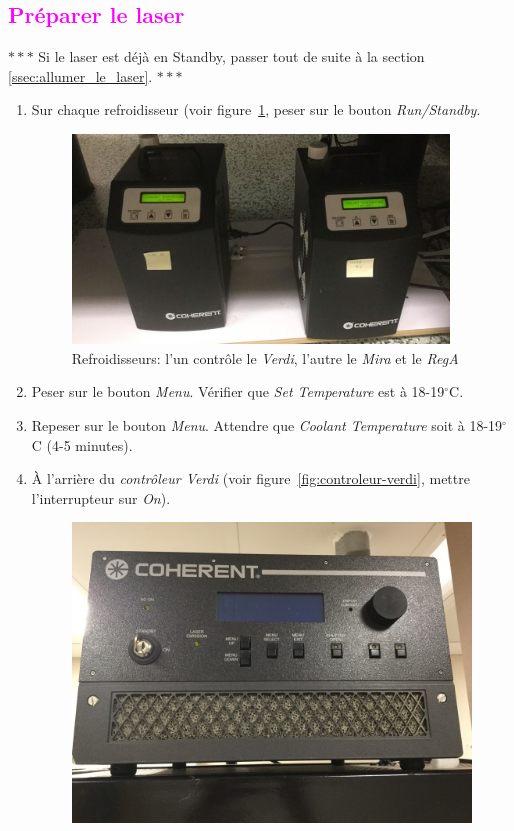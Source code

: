 \subsection{\textcolor{magenta}{Préparer le laser}}
\begin{center} $\ast\ast\ast$ Si le laser est déjà en Standby, passer tout de suite à la section \ref{ssec:allumer_le_laser}. $\ast\ast\ast$ \end{center}
\begin{enumerate}
    \item Sur chaque refroidisseur (voir figure~\ref{fig:cooler}, peser sur le bouton \textit{Run/Standby}.
        \begin{figure}[H]
        \centering
        \includegraphics[width=10cm]{cooler.jpg}
        \caption{Refroidisseurs: l'un contrôle le \textit{Verdi}, l'autre le \textit{Mira} et le \textit{RegA}}
        \label{fig:cooler}
        \end{figure}
    \item Peser sur le bouton \textit{Menu}. Vérifier que \textit{Set Temperature} est à 18-19$^\circ$C.
    \item Repeser sur le bouton \textit{Menu}. Attendre que \textit{Coolant Temperature} soit à 18-19$^\circ$C (4-5 minutes).
    \item À l'arrière du \textit{contrôleur Verdi} (voir figure~\ref{fig:controleur-verdi}, mettre l'interrupteur sur \textit{On}).
        \begin{figure}[H]
        \centering
        \includegraphics[width=12cm]{controleur-verdi.jpg}

\end{figure}
\end{enumerate}

